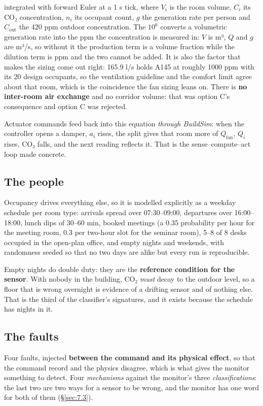 integrated with forward Euler at a 1 s tick, where $V_i$ is the room volume, $C_i$ its CO₂
concentration, $n_i$ its occupant count, $g$ the generation rate per person and $C_\text{out}$ the
420 ppm outdoor concentration. The $10^{6}$ converts a volumetric generation rate
into the ppm the concentration is measured in: $V$ is m³, $Q$ and $g$ are m³/s, so without it the
production term is a volume fraction while the dilution term is ppm and the two cannot be added.
It is also the factor that makes the sizing come out right: 165.9 l/s holds A145 at roughly
1000 ppm with its 20 design occupants, so the ventilation guideline and the comfort limit agree
about that room, which is the coincidence the fan sizing leans on. There is \textbf{no inter-room
air exchange} and no corridor volume: that was option C's consequence and option C was rejected.

Actuator commands feed back into this equation \emph{through BuildSim}: when the controller opens
a damper, $a_i$ rises, the split gives that room more of $Q_\text{fan}$, $Q_i$ rises, CO₂ falls,
and the next reading reflects it. That is the sense–compute–act loop made concrete.

\subsection{The people}\label{sec:6.4}

Occupancy drives everything else, so it is modelled explicitly as a weekday schedule per room
type: arrivals spread over 07:30–09:00, departures over 16:00–18:00, lunch dips of 30–60 min,
booked meetings (a 0.35 probability per hour for the meeting room, 0.3 per two-hour slot for the
seminar room), 5–8 of 8 desks occupied in the open-plan office, and empty nights and weekends,
with randomness seeded so that no two days are alike but every run is reproducible.

Empty nights do double duty: they are the \textbf{reference condition for the sensor}. With nobody
in the building, CO₂ \emph{must} decay to the outdoor level, so a floor that is wrong overnight is
evidence of a drifting sensor and of nothing else. That is the third of the classifier's
signatures, and it exists because the schedule has nights in it.

\subsection{The faults}\label{sec:6.5}

Four faults, injected \textbf{between the command and its physical effect}, so that the command
record and the physics disagree, which is what gives the monitor something to detect. Four
\emph{mechanisms} against the monitor's three \emph{classifications}: the last two are two ways for
a sensor to be wrong, and the monitor has one word for both of them (§\ref{sec:7.3}).


